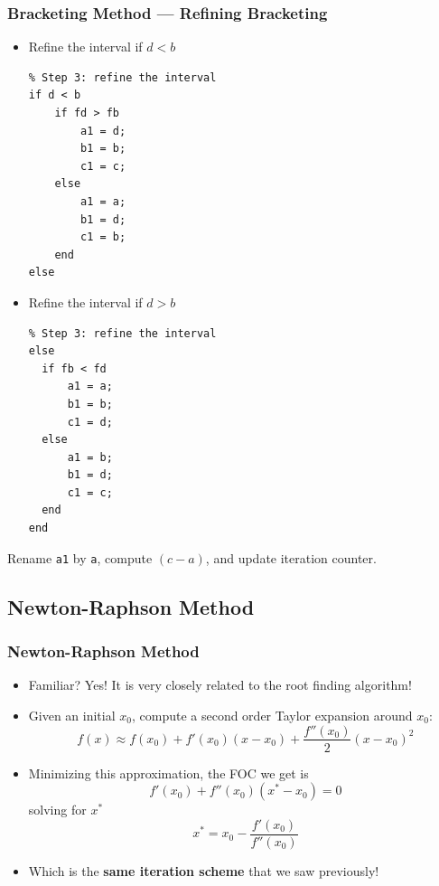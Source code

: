 \documentclass[11pt,xcolor={svgnames},aspectratio=169,usepdftitle=false]{beamer}
\begin{document}
\begin{frame}[fragile]
  \frametitle{Bracketing Method --- Refining Bracketing}
\begin{minipage}{0.48\textwidth}
  \begin{itemize}
    \item Refine the interval if $d < b$
    \begin{lstlisting}
% Step 3: refine the interval
if d < b
    if fd > fb
        a1 = d;
        b1 = b;
        c1 = c;
    else
        a1 = a;
        b1 = d;
        c1 = b;
    end
else
    \end{lstlisting}
  \end{itemize}
\end{minipage}
\begin{minipage}{0.48\textwidth}
  \begin{itemize}
    \item Refine the interval if $d > b$
    \begin{lstlisting}
% Step 3: refine the interval
else
  if fb < fd
      a1 = a;
      b1 = b;
      c1 = d;
  else
      a1 = b;
      b1 = d;
      c1 = c;
  end
end
    \end{lstlisting}
  \end{itemize}
\end{minipage}
Rename \verb;a1; by \verb;a;, compute $(c - a)$, and update iteration counter.
\end{frame}

\subsection{Newton-Raphson Method}

\begin{frame}
  \frametitle{Newton-Raphson Method}
\begin{itemize}
  \item Familiar? Yes! It is very closely related to the root finding algorithm!
  \item Given an initial $x_0$, compute a second order Taylor expansion around $x_0$:
  \[
  f(x) \approx f(x_0) + f'(x_0)(x - x_0) + \frac{f''(x_0)}{2}(x - x_0)^2
  \]
  \item Minimizing this approximation, the FOC we get is
  \[
  f'(x_0) + f''(x_0)(x^* - x_0) = 0
  \]
  solving for $x^*$
  \[
  x^* = x_0 - \frac{f'(x_0)}{f''(x_0)}
  \]
  \item Which is the \alert{\textbf{same iteration scheme}} that we saw previously!
\end{itemize}
\end{frame}
\end{document}
